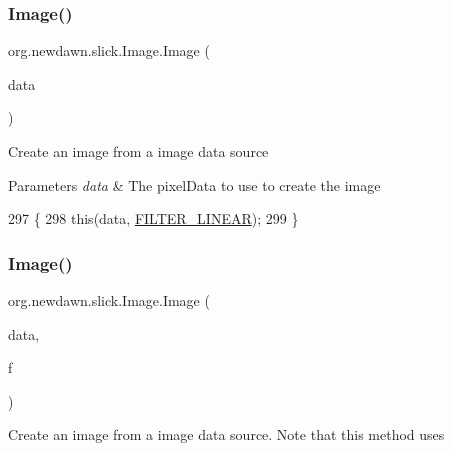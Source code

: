 \subsubsection{\texorpdfstring{Image()}{Image()}\hspace{0.1cm}{\footnotesize\ttfamily [15/16]}}
{\footnotesize\ttfamily org.\+newdawn.\+slick.\+Image.\+Image (\begin{DoxyParamCaption}\item[{\mbox{\hyperlink{interfaceorg_1_1newdawn_1_1slick_1_1opengl_1_1_image_data}{Image\+Data}}}]{data }\end{DoxyParamCaption})\hspace{0.3cm}{\ttfamily [inline]}}

Create an image from a image data source


\begin{DoxyParams}{Parameters}
{\em data} & The pixel\+Data to use to create the image \\
\hline
\end{DoxyParams}

\begin{DoxyCode}
297                                  \{
298         \textcolor{keyword}{this}(data, \mbox{\hyperlink{classorg_1_1newdawn_1_1slick_1_1_image_ad3ba5404a81c4fad40140cbd517fae3d}{FILTER\_LINEAR}});
299     \}
\end{DoxyCode}
\mbox{\label{classorg_1_1newdawn_1_1slick_1_1_image_a0aa6cab817c15223c195aef4d6e3a68b}} 
\subsubsection{\texorpdfstring{Image()}{Image()}\hspace{0.1cm}{\footnotesize\ttfamily [16/16]}}
{\footnotesize\ttfamily org.\+newdawn.\+slick.\+Image.\+Image (\begin{DoxyParamCaption}\item[{\mbox{\hyperlink{interfaceorg_1_1newdawn_1_1slick_1_1opengl_1_1_image_data}{Image\+Data}}}]{data,  }\item[{int}]{f }\end{DoxyParamCaption})\hspace{0.3cm}{\ttfamily [inline]}}

Create an image from a image data source. Note that this method uses


